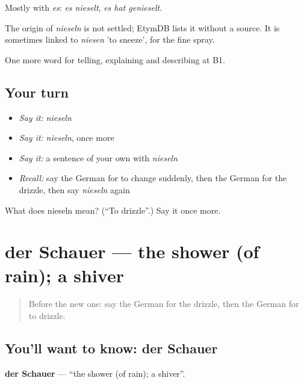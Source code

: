 Mostly with \emph{es}: \emph{es nieselt}, \emph{es hat genieselt}.

\begin{cousinweb}
The origin of \emph{nieseln} is not settled; EtymDB lists it without a source. It is sometimes linked to \emph{niesen} 'to sneeze', for the fine spray.
\end{cousinweb}

\begin{grammarlens}[title={What you've built}]
One more word for telling, explaining and describing at B1.
\end{grammarlens}

\subsection*{Your turn}
\begin{itemize}
\raggedright
  \item \emph{Say it:} \emph{nieseln}
  \item \emph{Say it:} \emph{nieseln}, once more
  \item \emph{Say it:} a sentence of your own with \emph{nieseln}
  \item \emph{Recall:} say the German for to change suddenly, then the German for the drizzle, then say \emph{nieseln} again
\end{itemize}

\begin{tcolorbox}[breakable,colback=teal!4,colframe=teal!35!black,title={Before you move on}]
What does nieseln mean? (\textquotedblleft{}To drizzle\textquotedblright{}.) Say it once more.
\end{tcolorbox}
\section[der Schauer]{der Schauer — the shower (of rain); a shiver}

\label{lesson:GE-C461-schauer}



\begin{quote}
Before the new one: say the German for the drizzle, then the German for to drizzle.
\end{quote}

\subsection*{You'll want to know: der Schauer}
\textbf{der Schauer} — \textquotedblleft{}the shower (of rain); a shiver\textquotedblright{}.

